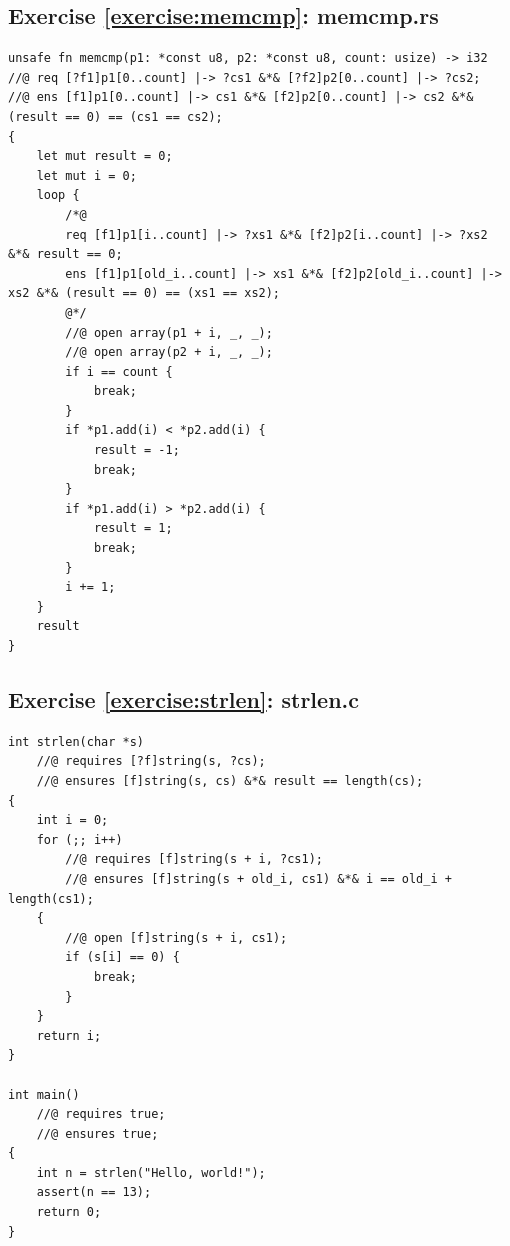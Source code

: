 \documentclass{article}
\begin{document}
\subsection{Exercise \ref{exercise:memcmp}:
memcmp.rs}\label{solution:memcmp}

\begin{lstlisting}
unsafe fn memcmp(p1: *const u8, p2: *const u8, count: usize) -> i32
//@ req [?f1]p1[0..count] |-> ?cs1 &*& [?f2]p2[0..count] |-> ?cs2;
//@ ens [f1]p1[0..count] |-> cs1 &*& [f2]p2[0..count] |-> cs2 &*& (result == 0) == (cs1 == cs2);
{
    let mut result = 0;
    let mut i = 0;
    loop {
        /*@
        req [f1]p1[i..count] |-> ?xs1 &*& [f2]p2[i..count] |-> ?xs2 &*& result == 0;
        ens [f1]p1[old_i..count] |-> xs1 &*& [f2]p2[old_i..count] |-> xs2 &*& (result == 0) == (xs1 == xs2);
        @*/
        //@ open array(p1 + i, _, _);
        //@ open array(p2 + i, _, _);
        if i == count {
            break;
        }
        if *p1.add(i) < *p2.add(i) {
            result = -1;
            break;
        }
        if *p1.add(i) > *p2.add(i) {
            result = 1;
            break;
        }
        i += 1;
    }
    result
}
\end{lstlisting}

\subsection{Exercise \ref{exercise:strlen}: strlen.c}\label{solution:strlen}

\begin{lstlisting}
int strlen(char *s)
    //@ requires [?f]string(s, ?cs);
    //@ ensures [f]string(s, cs) &*& result == length(cs);
{
    int i = 0;
    for (;; i++)
        //@ requires [f]string(s + i, ?cs1);
        //@ ensures [f]string(s + old_i, cs1) &*& i == old_i + length(cs1);
    {
        //@ open [f]string(s + i, cs1);
        if (s[i] == 0) {
            break;
        }
    }
    return i;
}

int main()
    //@ requires true;
    //@ ensures true;
{
    int n = strlen("Hello, world!");
    assert(n == 13);
    return 0;
}
\end{lstlisting}
\end{document}
